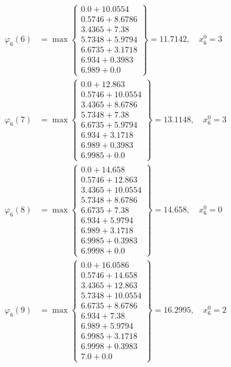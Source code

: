 \documentclass{article}
\begin{document}
\begin{align*}
\varphi_{6}(6) &= \max \left\{ \begin{array}{c}
0.0 + 10.0554 \\
 0.5746 + 8.6786 \\
 3.4365 + 7.38 \\
 5.7348 + 5.9794 \\
 6.6735 + 3.1718 \\
 6.934 + 0.3983 \\
 6.989 + 0.0
\end{array} \right\}=11.7142, \quad x_{6}^0=3\\
  
\varphi_{6}(7) &= \max \left\{ \begin{array}{c}
0.0 + 12.863 \\
 0.5746 + 10.0554 \\
 3.4365 + 8.6786 \\
 5.7348 + 7.38 \\
 6.6735 + 5.9794 \\
 6.934 + 3.1718 \\
 6.989 + 0.3983 \\
 6.9985 + 0.0
\end{array} \right\}=13.1148, \quad x_{6}^0=3\\
  
\varphi_{6}(8) &= \max \left\{ \begin{array}{c}
0.0 + 14.658 \\
 0.5746 + 12.863 \\
 3.4365 + 10.0554 \\
 5.7348 + 8.6786 \\
 6.6735 + 7.38 \\
 6.934 + 5.9794 \\
 6.989 + 3.1718 \\
 6.9985 + 0.3983 \\
 6.9998 + 0.0
\end{array} \right\}=14.658, \quad x_{6}^0=0\\
  
\varphi_{6}(9) &= \max \left\{ \begin{array}{c}
0.0 + 16.0586 \\
 0.5746 + 14.658 \\
 3.4365 + 12.863 \\
 5.7348 + 10.0554 \\
 6.6735 + 8.6786 \\
 6.934 + 7.38 \\
 6.989 + 5.9794 \\
 6.9985 + 3.1718 \\
 6.9998 + 0.3983 \\
 7.0 + 0.0
\end{array} \right\}=16.2995, \quad x_{6}^0=2\\
  

\end{align*}
\end{document}
